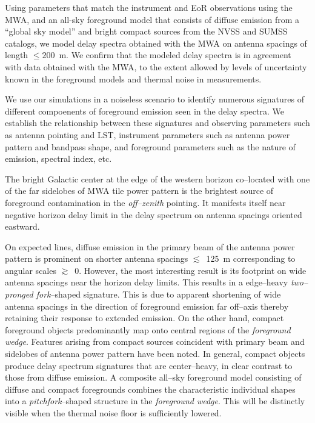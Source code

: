 \documentclass[preprint2,iop,numberedappendix]{emulateapj}
\begin{document}
Using parameters that match the instrument and EoR observations using the MWA, and an all-sky foreground model that consists of diffuse emission from a ``global sky model'' and bright compact sources from the NVSS and SUMSS catalogs, we model delay spectra obtained with the MWA on antenna spacings of length $\le 200$~m. We confirm that the modeled delay spectra is in agreement with data obtained with the MWA, to the extent allowed by levels of uncertainty known in the foreground models and thermal noise in measurements. 

We use our simulations in a noiseless scenario to identify numerous signatures of different compoenents of foreground emission seen in the delay spectra. We establish the relationship between these signatures and observing parameters such as antenna pointing and LST, instrument parameters such as antenna power pattern and bandpass shape, and foreground parameters such as the nature of emission, spectral index, etc. 

The bright Galactic center at the edge of the western horizon co--located with one of the far sidelobes of MWA tile power pattern is the brightest source of foreground contamination in the {\it off--zenith} pointing. It manifests itself near negative horizon delay limit in the delay spectrum on antenna spacings oriented eastward. 

On expected lines, diffuse emission in the primary beam of the antenna power pattern is prominent on shorter antenna spacings $\lesssim$~125~m corresponding to angular scales $\gtrsim$~0. However, the most interesting result is its footprint on wide antenna spacings near the horizon delay limits. This results in a edge--heavy {\it two--pronged fork}--shaped signature. This is due to apparent shortening of wide antenna spacings in the direction of foreground emission far off--axis thereby retaining their response to extended emission. On the other hand, compact foreground objects predominantly map onto central regions of the {\it foreground wedge}. Features arising from compact sources coincident with primary beam and sidelobes of antenna power pattern have been noted. In general, compact objects produce delay spectrum signatures that are center--heavy, in clear contrast to those from diffuse emission. A composite all--sky foreground model consisting of diffuse and compact foregrounds combines the characteristic individual shapes into a {\it pitchfork}--shaped structure in the {\it foreground wedge}. This will be distinctly visible when the thermal noise floor is sufficiently lowered. 
\end{document}
